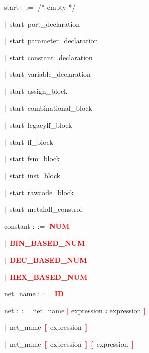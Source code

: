 
\vspace{1em}
\noindent
\settowidth{\parindent}{\hspace{4ex}}
start $::=$\hspace{1ex} /* empty */

\mbox{$|$ start port\_declaration}

\mbox{$|$ start parameter\_declaration}

\mbox{$|$ start constant\_declaration}

\mbox{$|$ start variable\_declaration}

\mbox{$|$ start assign\_block}

\mbox{$|$ start combinational\_block}

\mbox{$|$ start legacyff\_block}

\mbox{$|$ start ff\_block}

\mbox{$|$ start fsm\_block}

\mbox{$|$ start inst\_block}

\mbox{$|$ start rawcode\_block}

\mbox{$|$ start metahdl\_constrol}

\vspace{1em}
\noindent
\settowidth{\parindent}{\hspace{4ex}}
constant $::=$\hspace{1ex} \textbf{\textcolor{red}{NUM}}

\mbox{$|$ \textbf{\textcolor{red}{BIN\_BASED\_NUM}}}

\mbox{$|$ \textbf{\textcolor{red}{DEC\_BASED\_NUM}}}

\mbox{$|$ \textbf{\textcolor{red}{HEX\_BASED\_NUM}}}

\vspace{1em}
\noindent
\settowidth{\parindent}{\hspace{4ex}}
net\_name $::=$\hspace{1ex} \textbf{\textcolor{red}{ID}}

\vspace{1em}
\noindent
\settowidth{\parindent}{\hspace{4ex}}
net $::=$\hspace{1ex} net\_name \textbf{\textcolor{red}{[}} expression \textbf{\textcolor{red}{:}} expression \textbf{\textcolor{red}{]}}

\mbox{$|$ net\_name \textbf{\textcolor{red}{[}} expression \textbf{\textcolor{red}{]}}}

\mbox{$|$ net\_name \textbf{\textcolor{red}{[}} expression \textbf{\textcolor{red}{]}} \textbf{\textcolor{red}{[}} expression \textbf{\textcolor{red}{]}}}

